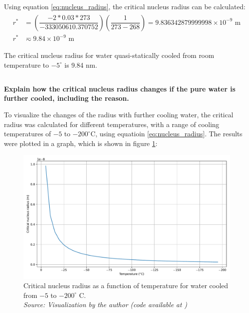 Using equation \ref{eq:nucleus_radius}, the critical nucleus radius can be calculated:
\begin{align}
  \label{eq:radius}
  \begin{split}
    r^*&=\left(\dfrac{-2*0.03*273}{-333050610.370752}\right)\left(\dfrac{1}{273-268}\right)=9.836342879999998\times 10^{-9}\text{ m} \\ 
    r^*&\eqsim 9.84\times 10^{-9} \text{ m}
  \end{split}
\end{align}

\begin{mdframed}
The critical nucleus radius for water quasi-statically cooled from room temperature to $-5^{\circ}$ is 9.84 nm.
\end{mdframed}


\subsection{}
\textbf{Explain how the critical nucleus radius changes if the pure water is
further cooled, including the reason.}

To visualize the changes of the radius with further cooling water, the critical radius was calculated for different temperatures, with a range of cooling temperatures of $-5$ to $-200^{\circ}$C, using equatioin \eqref{eq:nucleus_radius}. The results were plotted in a graph, which is shown in figure \ref{fig:critical_radius}:

\begin{figure}[h]
    \centering
    \includegraphics[width=1\textwidth]{graficas/critical_radius.pdf}
    \caption{Critical nucleus radius as a function of temperature for water cooled from $-5$ to $-200^{\circ}$ C. \\
    \textit{Source: Visualization by the author (code available at \citep{mygit})}}
    \label{fig:critical_radius}
\end{figure}

